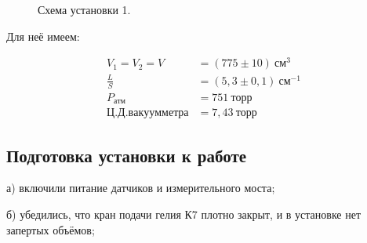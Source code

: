 \documentclass[a4paper, 12pt]{article}
\begin{document}
        \begin{figure}[ht]
            \caption{Схема установки 1.}
            \label{ustanovka}
        \end{figure}

        Для неё имеем:

        \begin{align*}
            V_1 = V_2 = V &= (775 \pm 10)~см^3\\
            \frac{L}{S} &= (5,3 \pm 0,1)~см^{-1}\\
            P_{атм} &= 751~торр\\
            Ц. Д. вакуумметра &= 7,43~торр
        \end{align*}

    \subsection{Подготовка установки к работе}
        а) включили питание датчиков и измерительного моста;

        б) убедились, что кран подачи гелия К7 плотно закрыт, и в установке нет
        запертых объёмов;
\end{document}
